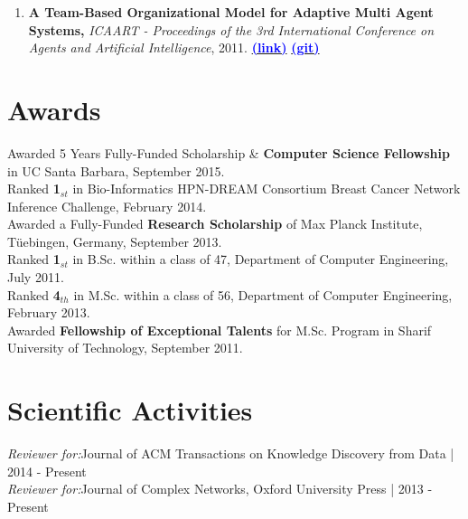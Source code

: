 \documentclass[letter]{res}
\begin{document}
\begin{resume}
\begin{enumerate}[leftmargin=-.01in]

\item \textbf{A Team-Based Organizational Model for Adaptive Multi Agent Systems,} \textit{ICAART - Proceedings of the 3rd International Conference on Agents and Artificial Intelligence}, 2011.
{\href{https://www.researchgate.net/publication/221539731_A_Team-based_Organizational_Model_for_Adaptive_Multi-agent_Systems}{\textbf{\textcolor{blue}{(link)}}}}
{\href{https://github.com/omid55/team_based_rescue_jade_multi_agent_system}{\textbf{\textcolor{blue}{(git)}}}}

\end{enumerate}


\section{Awards}
Awarded 5 Years Fully-Funded Scholarship \& \textbf{Computer Science Fellowship} in UC Santa Barbara, September 2015.\\
Ranked \textbf{1}$_{st}$ in Bio-Informatics HPN-DREAM Consortium Breast Cancer Network Inference Challenge, February 2014.\\
Awarded a Fully-Funded \textbf{Research Scholarship} of Max Planck Institute, Tüebingen, Germany, September 2013.\\
Ranked \textbf{1}$_{st}$ in B.Sc. within a class of 47, Department of Computer Engineering, July 2011.\\
Ranked \textbf{4}$_{th}$ in M.Sc. within a class of 56, Department of Computer Engineering, February 2013.\\
Awarded \textbf{Fellowship of Exceptional Talents} for M.Sc. Program in Sharif University of Technology, September 2011.


\section{Scientific Activities}
{\sl Reviewer for:}Journal of ACM Transactions on Knowledge Discovery from Data | 2014 - Present\\
{\sl Reviewer for:}Journal of Complex Networks, Oxford University Press | 2013 - Present



\end{resume}
\end{document}

